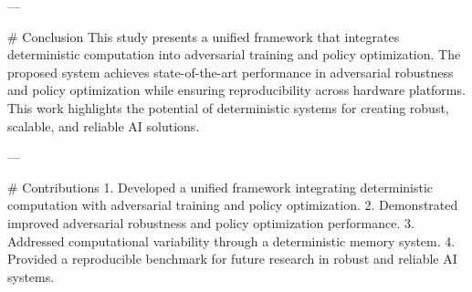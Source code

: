 ---

# Conclusion  
This study presents a unified framework that integrates deterministic computation into adversarial training and policy optimization. The proposed system achieves state-of-the-art performance in adversarial robustness and policy optimization while ensuring reproducibility across hardware platforms. This work highlights the potential of deterministic systems for creating robust, scalable, and reliable AI solutions.

---

# Contributions  
1. Developed a unified framework integrating deterministic computation with adversarial training and policy optimization.  
2. Demonstrated improved adversarial robustness and policy optimization performance.  
3. Addressed computational variability through a deterministic memory system.  
4. Provided a reproducible benchmark for future research in robust and reliable AI systems.

